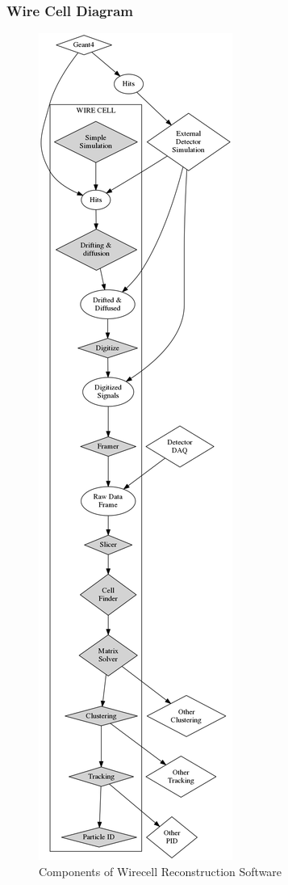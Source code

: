 \subsubsection{Wire Cell Diagram}
\label{sec:wc-diagram}
\begin{figure}[h!]
	\centering
	\includegraphics[height=0.8\textheight]{wirecell-dataflow-conceptual.png}
	\caption{Components of Wirecell Reconstruction Software}
	\label{fig:wirecell-diagram}
\end{figure}


\newpage